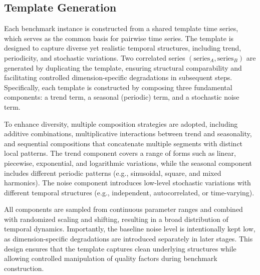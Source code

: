 \documentclass{article}
\begin{document}
\subsection{Template Generation}
\label{app:benchmark_template}

Each benchmark instance is constructed from a shared template time series, which serves as the common basis for pairwise time series. The template is designed to capture diverse yet realistic temporal structures, including trend, periodicity, and stochastic variations. Two correlated series $(\mathrm{series}_A, \mathrm{series}_B)$ are generated by duplicating the template, ensuring structural comparability and facilitating controlled dimension-specific degradations in subsequent steps.
Specifically, each template is constructed by composing three fundamental components: a trend term, a seasonal (periodic) term, and a stochastic noise term.

To enhance diversity, multiple composition strategies are adopted, including additive combinations, multiplicative interactions between trend and seasonality, and sequential compositions that concatenate multiple segments with distinct local patterns. The trend component covers a range of forms such as linear, piecewise, exponential, and logarithmic variations, while the seasonal component includes different periodic patterns (e.g., sinusoidal, square, and mixed harmonics). The noise component introduces low-level stochastic variations with different temporal structures (e.g., independent, autocorrelated, or time-varying).

All components are sampled from continuous parameter ranges and combined with randomized scaling and shifting, resulting in a broad distribution of temporal dynamics. Importantly, the baseline noise level is intentionally kept low, as dimension-specific degradations are introduced separately in later stages. This design ensures that the template captures clean underlying structures while allowing controlled manipulation of quality factors during benchmark construction.
\end{document}
